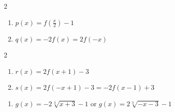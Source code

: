 \documentclass{ximera}
\begin{document}
\begin{multicols}{2}
\begin{enumerate}
\setcounter{enumi}{\value{HW}}

\item   $p(x) = f\left( \frac{x}{2} \right) -1$

\item  $q(x) = -2f(x) = 2f(-x)$ 

\setcounter{HW}{\value{enumi}}
\end{enumerate}
\end{multicols}



\begin{multicols}{2}
\begin{enumerate}
\setcounter{enumi}{\value{HW}}

\item  $r(x) = 2f(x+1)-3$

\item  $s(x) = 2f(-x+1)-3 = -2f(x-1)+3$  

\setcounter{HW}{\value{enumi}}
\end{enumerate}
\end{multicols}



\begin{enumerate}
\setcounter{enumi}{\value{HW}}



\item $g(x) = -2\sqrt[3]{x + 3} - 1$ or $g(x) = 2\sqrt[3]{-x - 3} - 1$

\setcounter{HW}{\value{enumi}}
\end{enumerate}
\end{document}
